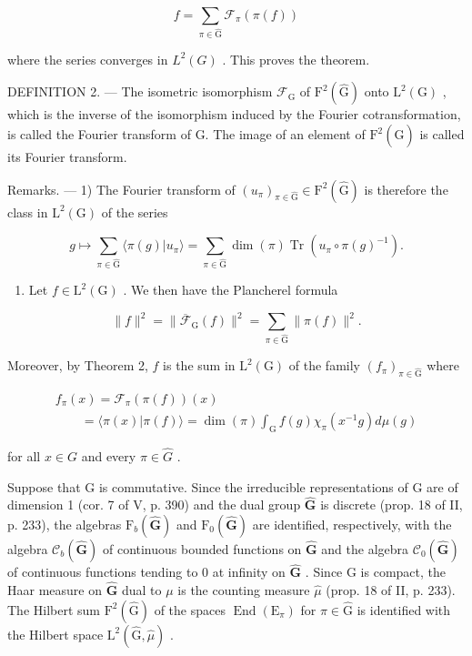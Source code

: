 \[
f = \sum_ {\pi \in \widehat {\mathrm{G}}} \mathcal {F} _ {\pi} (\pi (f))
\]

where the series converges in \(L^{2}(G)\) . This proves the theorem.

DEFINITION 2. --- The isometric isomorphism \(\mathcal{F}_{\mathrm{G}}\) of \(\mathrm{F}^2 (\widehat{\mathrm{G}})\) onto \(\mathrm{L}^2 (\mathrm{G})\) , which is the inverse of the isomorphism induced by the Fourier cotransformation, is called the Fourier transform of G. The image of an element of \(\mathrm{F}^2 (\widehat{\mathrm{G}})\) is called its Fourier transform.

Remarks. --- 1) The Fourier transform of \((u_{\pi})_{\pi \in \widehat{\mathrm{G}}} \in \mathrm{F}^2(\widehat{\mathrm{G}})\) is therefore the class in \(\mathrm{L}^2(\mathrm{G})\) of the series

\[
g \mapsto \sum_ {\pi \in \widehat {\mathrm{G}}} \langle \pi (g) | u _ {\pi} \rangle = \sum_ {\pi \in \widehat {\mathrm{G}}} \dim (\pi) \operatorname{Tr} (u _ {\pi} \circ \pi (g) ^ {- 1}).
\]

\begin{enumerate}
\def\labelenumi{\arabic{enumi})}
\setcounter{enumi}{1}
\tightlist
\item
  Let \(f \in \mathrm{L}^2(\mathrm{G})\) . We then have the Plancherel formula
\end{enumerate}

\[
\| f \| ^ {2} = \| \overline {{\mathcal {F}}} _ {\mathrm{G}} (f) \| ^ {2} = \sum_ {\pi \in \widehat {\mathrm{G}}} \| \pi (f) \| ^ {2}.
\]

Moreover, by Theorem 2, \(f\) is the sum in \(\mathrm{L}^2 (\mathrm{G})\) of the family \((f_{\pi})_{\pi \in \widehat{\mathrm{G}}}\) where

\[
\begin{array}{l} f _ {\pi} (x) = \mathcal {F} _ {\pi} (\pi (f)) (x) \\ \qquad = \langle \pi (x) | \pi (f) \rangle = \dim (\pi) \int_ {\mathrm{G}} f (g) \chi_ {\pi} (x ^ {- 1} g) d \mu (g) \end{array}
\]

for all \(x \in G\) and every \(\pi \in \widehat{G}\) .

Suppose that G is commutative. Since the irreducible representations of G are of dimension 1 (cor. 7 of V, p. 390) and the dual group \(\widehat{\mathbf{G}}\) is discrete (prop. 18 of II, p. 233), the algebras \(\mathrm{F}_b(\widehat{\mathbf{G}})\) and \(\mathrm{F}_0(\widehat{\mathbf{G}})\) are identified, respectively, with the algebra \(\mathcal{C}_b(\widehat{\mathbf{G}})\) of continuous bounded functions on \(\widehat{\mathbf{G}}\) and the algebra \(\mathcal{C}_0(\widehat{\mathbf{G}})\) of continuous functions tending to 0 at infinity on \(\widehat{\mathbf{G}}\) . Since G is compact, the Haar measure on \(\widehat{\mathbf{G}}\) dual to \(\mu\) is the counting measure \(\widehat{\mu}\) (prop. 18 of II, p. 233). The Hilbert sum \(\mathrm{F}^2 (\widehat{\mathrm{G}})\) of the spaces \(\operatorname{End}(\mathrm{E}_{\pi})\) for \(\pi \in \widehat{\mathrm{G}}\) is identified with the Hilbert space \(\mathrm{L}^2 (\widehat{\mathrm{G}},\widehat{\mu})\) .

